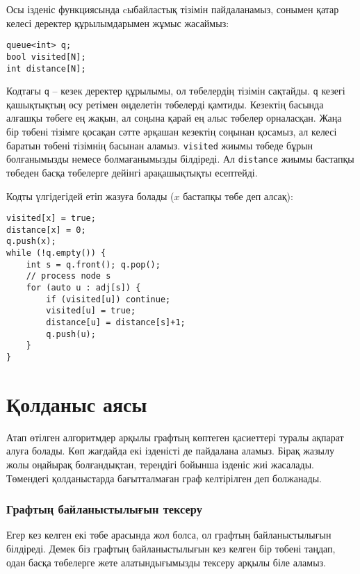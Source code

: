 Осы ізденіс функциясында cыбайластық тізімін пайдаланамыз, сонымен қатар келесі деректер құрылымдарымен жұмыс жасаймыз:
\begin{lstlisting}
queue<int> q;
bool visited[N];
int distance[N];
\end{lstlisting}

Кодтағы \texttt{q} -- кезек деректер құрылымы, ол төбелердің тізімін
сақтайды. 
\texttt{q} кезегі қашықтықтың өсу ретімен өңделетін төбелерді қамтиды.
Кезектің басында алғашқы төбеге ең жақын,
ал соңына қарай ең алыс төбелер орналасқан. Жаңа бір төбені тізімге қосақан сәтте әрқашан
кезектің соңынан қосамыз, ал келесі баратын төбені тізімнің басынан аламыз. \texttt{visited} жиымы төбеде бұрын болғанымызды немесе болмағанымызды білдіреді. Ал \texttt{distance} жиымы бастапқы төбеден басқа
төбелерге дейінгі арақашықтықты есептейді.

Кодты үлгідегідей етіп жазуға болады ($x$ бастапқы төбе деп алсақ):
\begin{lstlisting}
visited[x] = true;
distance[x] = 0;
q.push(x);
while (!q.empty()) {
    int s = q.front(); q.pop();
    // process node s
    for (auto u : adj[s]) {
        if (visited[u]) continue;
        visited[u] = true;
        distance[u] = distance[s]+1;
        q.push(u);
    }
}
\end{lstlisting}

\section{Қолданыс аясы}

Атап өтілген алгоритмдер арқылы графтың көптеген
қасиеттері туралы ақпарат алуға болады.
Көп жағдайда екі ізденісті де пайдалана аламыз.
Бірақ жазылу жолы оңайырақ болғандықтан, тереңдігі бойынша
ізденіс жиі жасалады. 
Төмендегі қолданыстарда бағытталмаған граф келтірілген деп болжанады.

\subsubsection{Графтың байланыстылығын тексеру}


Егер кез келген екі төбе арасында
жол болса, ол графтың байланыстылығын білдіреді. Демек
біз графтың байланыстылығын кез келген бір
төбені таңдап, одан басқа төбелерге
жете алатындығымызды тексеру арқылы біле аламыз.

